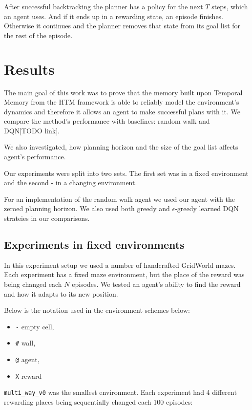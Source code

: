 \documentclass[runningheads]{llncs}
\begin{document}
After successful backtracking the planner has a policy for the next $T$ steps, which an agent uses. And if it ends up in a rewarding state, an episode finishes. Otherwise it continues and the planner removes that state from its goal list for the rest of the episode.

\section{Results}

The main goal of this work was to prove that the memory built upon Temporal Memory from the HTM framework is able to reliably model the environment's dynamics and therefore it allows an agent to make successful plans with it. We compare the method's performance with baselines: random walk and DQN[TODO link].

We also investigated, how planning horizon and the size of the goal list affects agent's performance.

Our experiments were split into two sets. The first set was in a fixed environment and the second - in a changing environment.

For an implementation of the random walk agent we used our agent with the zeroed planning horizon. We also used both greedy and $\epsilon$-greedy learned DQN strateies in our comparisons.

\subsection{Experiments in fixed environments}

In this experiment setup we used a number of handcrafted GridWorld mazes. Each experiment has a fixed maze environment, but the place of the reward was being changed each $N$ episodes. We tested an agent's ability to find the reward and how it adapts to its new position.

Below is the notation used in the environment schemes below:
\begin{itemize}
    \item \verb|-| empty cell,
    \item \verb|#| wall,
    \item \verb|@| agent,
    \item \verb|X| reward
\end{itemize}

\texttt{multi\_way\_v0} was the smallest environment. Each experiment had 4 different rewarding places being sequentially changed each 100 episodes:
\end{document}
